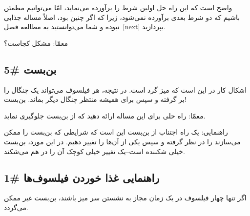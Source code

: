 \documentclass{book}
\newcommand{\clearemptydoublepage}{\newpage\cleardoublepage}
\begin{document}
    واضح است که این راه حل اولین شرط را برآورده می‌نماید، امّا می‌توانیم مطمئن باشیم که دو شرط  بعدی برآورده نمی‌شود، زیرا که 
    اگر چنین بود، اصلاً مساله جذابی نبوده و شما می‌توانستید به مطالعه فصل~\ref{next} بپردازید. 

    معمّا:‌ مشکل کجاست؟


\clearemptydoublepage
\subsection{بن‌بست \#5}

    اشکال کار در این است که میز گرد است. در نتیجه، هر فیلسوف می‌تواند یک چنگال را بر گرفته و سپس برای همیشه منتظر چنگال دیگر بماند. بن‌بست! 

    معمّا: راه حلی برای این مساله ارائه دهید که از بن‌بست جلوگیری نماید. 

    راهنمایی: یک راه اجتناب از بن‌بست این است که شرایطی که بن‌بست را ممکن می‌سازند را در نظر گرفته  و سپس یکی از آن‌ها را تغییر دهیم. 
    در این مورد، بن‌بست خیلی شکننده است--یک تغییر خیلی کوچک آن را در هم می‌شکند. 

\clearemptydoublepage
\subsection{راهنمایی غذا خوردن فیلسوف‌ها \#1}

    اگر تنها چهار فیلسوف در یک زمان مجاز به نشستن سر میز باشند، بن‌بست غیر ممکن می‌گردد. 
\end{document}
